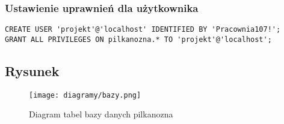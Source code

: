         \subsubsection{Ustawienie uprawnień dla użytkownika}
        \begin{lstlisting}
CREATE USER 'projekt'@'localhost' IDENTIFIED BY 'Pracownia107!'; 
GRANT ALL PRIVILEGES ON pilkanozna.* TO 'projekt'@'localhost';
        \end{lstlisting}

    \pagebreak
    \subsection{Rysunek}
        \begin{figure}[!htb]
            \centering
            \texttt{[image: diagramy/bazy.png]}
            \caption{Diagram tabel bazy danych pilkanozna}
        \end{figure}